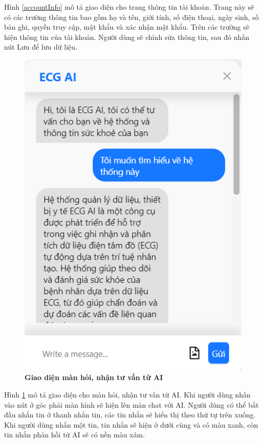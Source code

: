 Hình \ref{accountInfo} mô tả giao diện cho trang thông tin tài khoản. Trang này sẽ có các trường thông tin bao gồm 
họ và tên, giới tính, số điện thoại, ngày sinh, số bản ghi, quyền truy cập, mật khẩu và xác nhận mật khẩu. Trên các trường sẽ hiện thông tin của tài khoản. 
Người dùng sẽ chỉnh sửa thông tin, sau đó nhấn nút Lưu để lưu dữ liệu.

\begin{figure}[H]
  \centering
  \includegraphics[scale=0.5]{Images/server/webUI/chat_ai.png}
  \caption[Giao diện màn hỏi, nhận tư vấn từ AI]{\bfseries \fontsize{12pt}{0pt}\selectfont Giao diện màn hỏi, nhận tư vấn từ AI}
  \label{chatAI} %
\end{figure}

Hình \ref{chatAI} mô tả giao diện cho màn hỏi, nhận tư vấn từ AI. Khi người dùng nhấn vào nút ở góc phải màn hình sẽ hiện lên màn chat với AI. 
Người dùng có thể bắt đầu nhắn tin ở thanh nhắn tin, các tin nhắn sẽ hiển thị theo thứ tự trên xuống. Khi người dùng nhắn một tin, tin nhắn sẽ hiện ở dưới cùng và 
có màu xanh, còn tin nhắn phản hồi từ AI sẽ có nền màu xám. 

